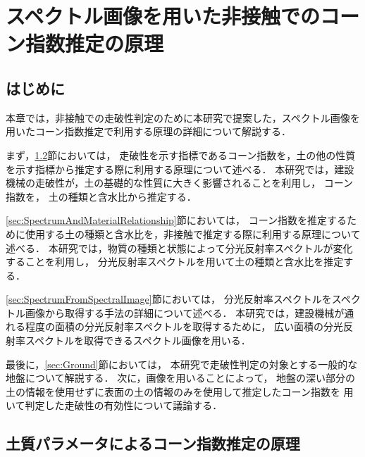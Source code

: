 \chapter{スペクトル画像を用いた非接触でのコーン指数推定の原理}
\thispagestyle{empty}
\label{ch:PrinciplesOfMethod}
\minitoc

\newpage

\section{はじめに}

本章では，非接触での走破性判定のために本研究で提案した，スペクトル画像を用いたコーン指数推定で利用する原理の詳細について解説する．

まず，\ref{sec:PrimciplesOfConeindexEstimation}節においては，
走破性を示す指標であるコーン指数を，土の他の性質を示す指標から推定する際に利用する原理について述べる．
本研究では，建設機械の走破性が，土の基礎的な性質に大きく影響されることを利用し，
コーン指数を，
土の種類と含水比から推定する．

\ref{sec:SpectrumAndMaterialRelationship}節においては，
コーン指数を推定するために使用する土の種類と含水比を，非接触で推定する際に利用する原理について述べる．
本研究では，物質の種類と状態によって分光反射率スペクトルが変化することを利用し，
分光反射率スペクトルを用いて土の種類と含水比を推定する．

\ref{sec:SpectrumFromSpectralImage}節においては，
分光反射率スペクトルをスペクトル画像から取得する手法の詳細について述べる．
本研究では，建設機械が通れる程度の面積の分光反射率スペクトルを取得するために，
広い面積の分光反射率スペクトルを取得できるスペクトル画像を用いる．

最後に，\ref{sec:Ground}節においては，
本研究で走破性判定の対象とする一般的な地盤について解説する．
次に，画像を用いることによって，
地盤の深い部分の土の情報を使用せずに表面の土の情報のみを使用して推定したコーン指数を
用いて判定した走破性の有効性について議論する．

\newpage


\section{土質パラメータによるコーン指数推定の原理}
\label{sec:PrimciplesOfConeindexEstimation}

